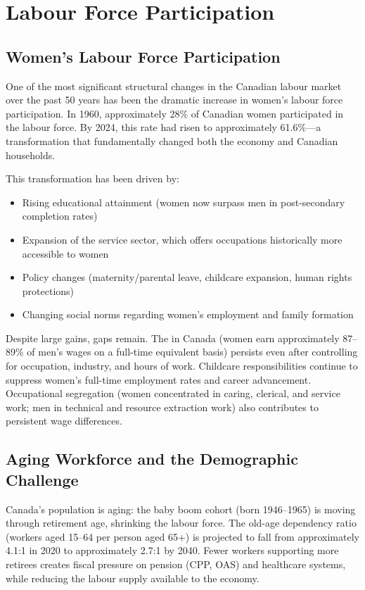 \section{Labour Force Participation}

\subsection{Women's Labour Force Participation}

One of the most significant structural changes in the Canadian labour market over the past 50 years has been the dramatic increase in women's labour force participation. In 1960, approximately 28\% of Canadian women participated in the labour force. By 2024, this rate had risen to approximately 61.6\%---a transformation that fundamentally changed both the economy and Canadian households.

This transformation has been driven by:
\begin{itemize}
  \item Rising educational attainment (women now surpass men in post-secondary completion rates)
  \item Expansion of the service sector, which offers occupations historically more accessible to women
  \item Policy changes (maternity/parental leave, childcare expansion, human rights protections)
  \item Changing social norms regarding women's employment and family formation
\end{itemize}

Despite large gains, gaps remain. The  in Canada (women earn approximately 87--89\% of men's wages on a full-time equivalent basis) persists even after controlling for occupation, industry, and hours of work. Childcare responsibilities continue to suppress women's full-time employment rates and career advancement. Occupational segregation (women concentrated in caring, clerical, and service work; men in technical and resource extraction work) also contributes to persistent wage differences.

\subsection{Aging Workforce and the Demographic Challenge}

Canada's population is aging: the baby boom cohort (born 1946--1965) is moving through retirement age, shrinking the labour force. The old-age dependency ratio (workers aged 15--64 per person aged 65+) is projected to fall from approximately 4.1:1 in 2020 to approximately 2.7:1 by 2040. Fewer workers supporting more retirees creates fiscal pressure on pension (CPP, OAS) and healthcare systems, while reducing the labour supply available to the economy.

